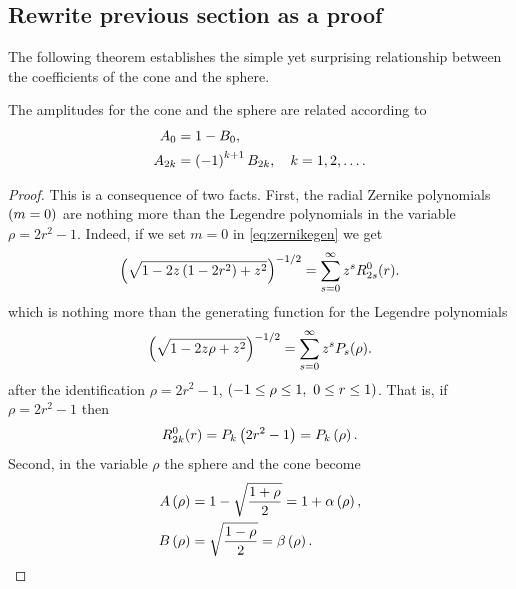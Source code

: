 \documentclass[preprint,12pt]{elsarticle}
\begin{document}
\subsection{Rewrite previous section as a proof}
The following theorem establishes the simple yet surprising relationship between the coefficients of the cone and the sphere.
{\color{blue}
\begin{myTheorem}  %
The amplitudes for the cone and the sphere are related according to
  \begin{equation}
    \begin{split}
      A_{0} &= 1 - B_{0}, \\
      A_{2k} &= \left( -1 \right)^{k+1}B_{2k}, \quad k=1,2,\dots .
    \end{split}
    \label{eq:23X}
  \end{equation}
  \label{thm:main}
\end{myTheorem}  %
%
\begin{proof}  %
This is a consequence of two facts. First, the radial Zernike polynomials $\left( m=0 \right)$ are nothing more than the Legendre polynomials in the variable $\rho=2r^{2}-1$. Indeed, if we set $m=0$ in \eqref{eq:zernikegen} we get
\begin{equation*}
  \left( \sqrt{1-2z\left( 1-2r^{2} \right)+z^{2}} \right)^{-1/2} = \sum_{s=0}^{\infty} z^{s} R_{2s}^{0}(r).
\end{equation*}
which is nothing more than the generating function for the Legendre polynomials
\begin{equation*}
  \left( \sqrt{1-2z\rho+z^{2}} \right)^{-1/2} = \sum_{s=0}^{\infty} z^{s}P_{s}(\rho).
\end{equation*}
after the identification $\rho=2r^{2}-1$, $\left( -1\le \rho \le 1,\ 0 \le r \le 1 \right)$. That is, if $\rho=2r^{2}-1$ then 
\begin{equation*}
  R_{2k}^{0}(r) = P_{k}\left( 2r^{2}-1 \right) = P_{k}\left( \rho \right).
\end{equation*}
Second, in the variable $\rho$ the sphere and the cone become
  \begin{equation}
    \begin{split}
      A\paren{\rho} & = 1 - \sqrt{\frac{1+\rho}{2}} = 1 + \alpha\paren{\rho}, \\
      B\paren{\rho} & = \sqrt{\frac{1-\rho}{2}} = \beta\paren{\rho}.
    \end{split}

\end{equation}
\end{proof}}
\end{document}
